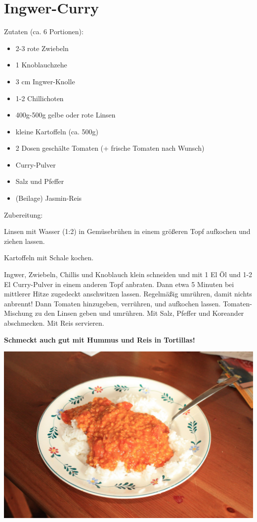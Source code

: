 \section{Ingwer-Curry}
Zutaten (ca. 6 Portionen):
\begin{itemize}
    \item 2-3 rote Zwiebeln
    \item 1 Knoblauchzehe
    \item 3 cm Ingwer-Knolle
	\item 1-2 Chillichoten
    \item 400g-500g gelbe oder rote Linsen
	\item kleine Kartoffeln (ca. 500g)
    \item 2 Dosen geschälte Tomaten (+ frische Tomaten nach Wunsch)
    \item Curry-Pulver
    \item Salz und Pfeffer
    \item (Beilage) Jasmin-Reis
\end{itemize}

\noindent Zubereitung:

\noindent Linsen mit Wasser (1:2) in Gemüsebrühen in einem größeren Topf
aufkochen und ziehen lassen.

Kartoffeln mit Schale kochen.

\noindent Ingwer, Zwiebeln, Chillis und Knoblauch klein schneiden und mit 1
El Öl und 1-2 El Curry-Pulver in einem anderen Topf anbraten. Dann etwa 5
Minuten bei mittlerer Hitze zugedeckt anschwitzen lassen. Regelmäßig umrühren,
damit nichts anbrennt! Dann Tomaten hinzugeben, verrühren, und aufkochen
lassen. Tomaten-Mischung zu den Linsen geben und umrühren. Mit Salz, Pfeffer und Koreander
abschmecken. Mit Reis servieren.

\noindent \textbf{Schmeckt auch gut mit Hummus und Reis in Tortillas!}

\newpage
\mbox{}
\vfill
\begin{center}
    \includegraphics[width=\textwidth]{Ingwer-Curry/IMG_6088_small.jpg}
\end{center}
\vfill
\mbox{ }
\newpage

